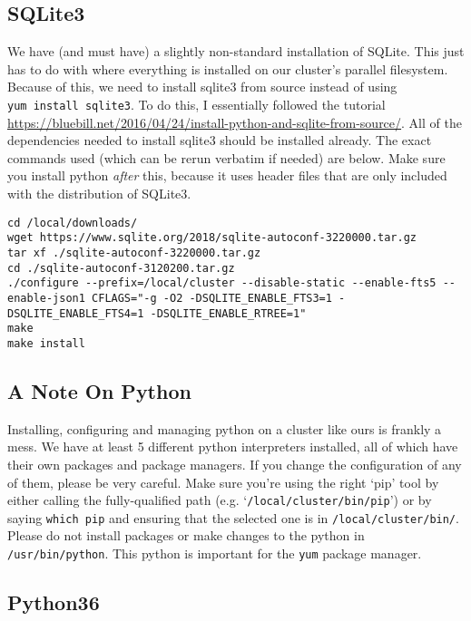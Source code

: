 \documentclass[]{book}
\theoremstyle{definition}
\theoremstyle{definition}
\theoremstyle{definition}
\theoremstyle{remark}
\begin{document}
\subsection{SQLite3}\label{sqlite3}

We have (and must have) a slightly non-standard installation of SQLite.
This just has to do with where everything is installed on our cluster's
parallel filesystem. Because of this, we need to install sqlite3 from
source instead of using \texttt{yum\ install\ sqlite3}. To do this, I
essentially followed the tutorial
\href{Here}{https://bluebill.net/2016/04/24/install-python-and-sqlite-from-source/}.
All of the dependencies needed to install sqlite3 should be installed
already. The exact commands used (which can be rerun verbatim if needed)
are below. Make sure you install python \emph{after} this, because it
uses header files that are only included with the distribution of
SQLite3.

\begin{verbatim}
cd /local/downloads/
wget https://www.sqlite.org/2018/sqlite-autoconf-3220000.tar.gz
tar xf ./sqlite-autoconf-3220000.tar.gz
cd ./sqlite-autoconf-3120200.tar.gz
./configure --prefix=/local/cluster --disable-static --enable-fts5 --enable-json1 CFLAGS="-g -O2 -DSQLITE_ENABLE_FTS3=1 -DSQLITE_ENABLE_FTS4=1 -DSQLITE_ENABLE_RTREE=1"
make
make install
\end{verbatim}

\subsection{A Note On Python}\label{a-note-on-python}

Installing, configuring and managing python on a cluster like ours is
frankly a mess. We have at least 5 different python interpreters
installed, all of which have their own packages and package managers. If
you change the configuration of any of them, please be very careful.
Make sure you're using the right `pip' tool by either calling the
fully-qualified path (e.g. `\texttt{/local/cluster/bin/pip}') or by
saying \texttt{which\ pip} and ensuring that the selected one is in
\texttt{/local/cluster/bin/}. Please do not install packages or make
changes to the python in \texttt{/usr/bin/python}. This python is
important for the \texttt{yum} package manager.

\subsection{Python36}\label{python36}
\end{document}

